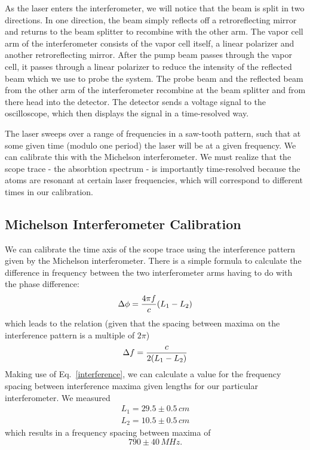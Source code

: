 \documentclass{article}
\DeclarePairedDelimiter{\parens}{\lparen}{\rparen}
\begin{document}
  As the laser enters the interferometer, we will notice that the beam is split in two directions.  In one direction, the beam simply reflects off a retroreflecting mirror and returns to the beam splitter to recombine with the other arm.  The vapor cell arm of the interferometer consists of the vapor cell itself, a linear polarizer and another retroreflecting mirror.  After the pump beam passes through the vapor cell, it passes through a linear polarizer to reduce the intensity of the reflected beam which we use to probe the system.  The probe beam and the reflected beam from the other arm of the interferometer recombine at the beam splitter and from there head into the detector.  The detector sends a voltage signal to the oscilloscope, which then displays the signal in a time-resolved way.

  \hspace{.25cm}

  The laser sweeps over a range of frequencies in a saw-tooth pattern, such that at some given time (modulo one period) the laser will be at a given frequency.  We can calibrate this with the Michelson interferometer.  We must realize that the scope trace - the absorbtion spectrum - is importantly time-resolved because the atoms are resonant at certain laser frequencies, which will correspond to different times in our calibration.

  \subsection{Michelson Interferometer Calibration}
  We can calibrate the time axis of the scope trace using the interference pattern given by the Michelson interferometer.  There is a simple formula to calculate the difference in frequency between the two interferometer arms having to do with the phase difference:
  \begin{equation*}
    \Delta \phi = \frac{4\pi f}{c}\parens*{L_1 - L_2}
  \end{equation*}
  which leads to the relation (given that the spacing between maxima on the interference pattern is a multiple of $2\pi$)
  \begin{equation}
    \Delta f = \frac{c}{2\parens*{L_1 - L_2}}
    \label{interference}
  \end{equation}
  Making use of Eq.~\ref{interference}, we can calculate a value for the frequency spacing between interference maxima given lengths for our particular interferometer.  We measured
  \begin{gather*}
    L_1 = 29.5 \pm 0.5 \, cm \\
    L_2 = 10.5 \pm 0.5 \, cm
  \end{gather*}
  which results in a frequency spacing between maxima of
  \begin{equation}
    790 \pm 40 \, M\!H\!z.
    \label{freq_conv}
  \end{equation}
\end{document}
